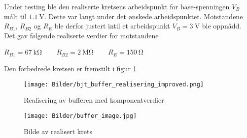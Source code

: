 Under testing ble den realiserte kretsens arbeidspunkt for base-spenningen $V_B$ målt til $\SI{1.1}{\volt}$. Dette 
var langt under det ønskede arbeidspunktet. Motstandene $R_{B1}$, $R_{B2}$ og $R_E$ ble derfor justert intil 
et arbeidspunkt $V_B = \SI{3}{\volt}$ ble oppnådd. Det gav følgende realiserte verdier for motstandene 
\begin{center}
    $R_{B1} = \SI{67}{\kilo\ohm}\:\:\:\:$ $\:\:\:\:R_{B2} = \SI{2}{\mega\ohm}\:\:\:\:$ $\:\:\:\:R_E = \SI{150}{\ohm}$
\end{center}

Den forbedrede kretsen er fremstilt i figur \ref{fig:buffer_realisering_forbedret}

\begin{figure}[H]
    \centering
    \texttt{[image: Bilder/bjt\_buffer\_realisering\_improved.png]}
    \caption{Realisering av bufferen med komponentverdier}
    \label{fig:buffer_realisering_forbedret}
\end{figure}

\begin{figure}[H]
    \centering 
    \texttt{[image: Bilder/buffer\_image.jpg]}
    \caption{Bilde av realisert krets}
    \label{fig:buffer_image}
\end{figure}
